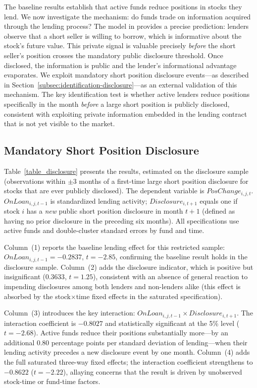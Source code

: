 
The baseline results establish that active funds reduce positions in stocks they lend. We now investigate the mechanism: do funds trade on information acquired through the lending process? The model in \citet{Nurisso2026} provides a precise prediction: lenders observe that a short seller is willing to borrow, which is informative about the stock's future value. This private signal is valuable precisely \emph{before} the short seller's position crosses the mandatory public disclosure threshold. Once disclosed, the information is public and the lender's informational advantage evaporates. We exploit mandatory short position disclosure events---as described in Section~\ref{subsec:identification-disclosure}---as an external validation of this mechanism. The key identification test is whether active lenders reduce positions specifically in the month \textit{before} a large short position is publicly disclosed, consistent with exploiting private information embedded in the lending contract that is not yet visible to the market.

\subsection{Mandatory Short Position Disclosure}

Table~\ref{table_disclosure} presents the results, estimated on the disclosure sample (observations within $\pm 3$ months of a first-time large short position disclosure for stocks that are ever publicly disclosed). The dependent variable is $PosChange_{i,j,t}$. $OnLoan_{i,j,t-1}$ is standardized lending activity; $\mathit{Disclosure}_{i,t+1}$ equals one if stock $i$ has a \textit{new} public short position disclosure in month $t+1$ (defined as having no prior disclosure in the preceding six months). All specifications use active funds and double-cluster standard errors by fund and time.

Column~(1) reports the baseline lending effect for this restricted sample: $OnLoan_{i,j,t-1} = -0.2837$, $t = -2.85$, confirming the baseline result holds in the disclosure sample. Column~(2) adds the disclosure indicator, which is positive but insignificant ($0.3633$, $t = 1.25$), consistent with an absence of general reaction to impending disclosures among both lenders and non-lenders alike (this effect is absorbed by the stock$\times$time fixed effects in the saturated specification).

Column~(3) introduces the key interaction: $OnLoan_{i,j,t-1} \times \mathit{Disclosure}_{i,t+1}$. The interaction coefficient is $-0.8027$ and statistically significant at the 5\% level ($t = -2.68$). Active funds reduce their positions substantially more---by an additional 0.80 percentage points per standard deviation of lending---when their lending activity precedes a new disclosure event by one month. Column~(4) adds the full saturated three-way fixed effects; the interaction coefficient strengthens to $-0.8622$ ($t = -2.22$), allaying concerns that the result is driven by unobserved stock-time or fund-time factors.

